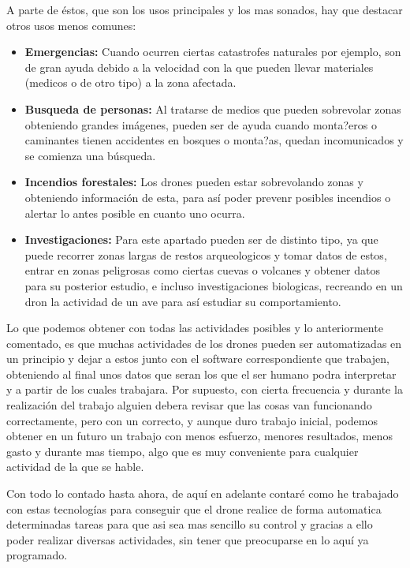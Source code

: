 A parte de \'estos, que son los usos principales y los mas sonados, hay que destacar otros usos menos comunes:
\begin{itemize}
	\item \textbf{Emergencias:} Cuando ocurren ciertas catastrofes naturales por ejemplo, son de gran ayuda debido a la velocidad con la que pueden llevar materiales (medicos o de otro tipo) a la zona afectada.

	\item \textbf{Busqueda de personas:} Al tratarse de medios que pueden sobrevolar zonas obteniendo grandes im\'agenes, pueden ser de ayuda cuando monta?eros o caminantes tienen accidentes en bosques o monta?as, quedan incomunicados y se comienza una b\'usqueda.

	\item \textbf{Incendios forestales:} Los drones pueden estar sobrevolando zonas y obteniendo informaci\'on de esta, para as\'i poder prevenr posibles incendios o alertar lo antes posible en cuanto uno ocurra. 

\item \textbf{Investigaciones:} Para este apartado pueden ser de distinto tipo, ya que puede recorrer zonas largas de restos arqueologicos y tomar datos de estos, entrar en zonas peligrosas como ciertas cuevas o volcanes y obtener datos para su posterior estudio, e incluso investigaciones biologicas, recreando en un dron la actividad de un ave para as\'i estudiar su comportamiento.
\end{itemize}
 
\hspace{1 cm} Lo que podemos obtener con todas las actividades posibles y lo anteriormente comentado, es que muchas actividades de los drones pueden ser automatizadas en un principio y dejar a estos junto con el software correspondiente que trabajen, obteniendo al final unos datos que seran los que el ser humano podra interpretar y a partir de los cuales trabajara. Por supuesto, con cierta frecuencia y durante la realizaci\'on del trabajo alguien debera revisar que las cosas van funcionando correctamente, pero con un correcto, y aunque duro trabajo inicial, podemos obtener en un futuro un trabajo con menos esfuerzo, menores resultados, menos gasto y durante mas tiempo, algo que es muy conveniente para cualquier actividad de la que se hable. 

\hspace{1 cm} Con todo lo contado hasta ahora, de aqu\'i en adelante contar\'e como he trabajado con estas tecnolog\'ias para conseguir que el drone realice de forma automatica determinadas tareas para que asi sea mas sencillo su control y gracias a ello poder realizar diversas actividades, sin tener que preocuparse en lo aqu\'i ya programado. 

 








